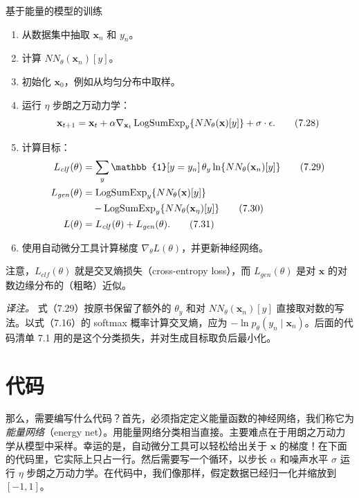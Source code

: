 \begin{booknote}[colframe=blue!65!black,colback=blue!4]{基于能量的模型的训练}
\begin{enumerate}
\item 从数据集中抽取 $\mathbf{x}_n$ 和 $y_n$。
\item 计算 $NN_\theta(\mathbf{x}_n)[y]$。
\item 初始化 $\mathbf{x}_0$，例如从均匀分布中取样。
\item 运行 $\eta$ 步朗之万动力学：
\begin{equation}
\mathbf{x}_{t+1}=\mathbf{x}_t+\alpha\nabla_{\mathbf{x}_t}
   \operatorname{LogSumExp}_y\{NN_\theta(\mathbf{x})[y]\}+\sigma\cdot\epsilon.
\tag{7.28}\label{eq:07-28}
\end{equation}
\item 计算目标：
\begin{align}
L_{\mathit{clf}}(\theta)
 &=\sum_y\mathbb{1}[y=y_n]\,\theta_y\ln\{NN_\theta(\mathbf{x}_n)[y]\}
        \tag{7.29}\label{eq:07-29}\\
L_{\mathit{gen}}(\theta)
 &=\LogSumExp_y\{NN_\theta(\mathbf{x})[y]\}\notag\\
 &\quad-\LogSumExp_y\{NN_\theta(\mathbf{x}_\eta)[y]\}
        \tag{7.30}\label{eq:07-30}\\
L(\theta)&=L_{\mathit{clf}}(\theta)+L_{\mathit{gen}}(\theta).
        \tag{7.31}\label{eq:07-31}
\end{align}
\item 使用自动微分工具计算梯度 $\nabla_\theta L(\theta)$，并更新神经网络。
\end{enumerate}
\end{booknote}
注意，$L_{\mathit{clf}}(\theta)$ 就是交叉熵损失（cross-entropy loss），而 $L_{\mathit{gen}}(\theta)$ 是对 $\mathbf{x}$ 的对数边缘分布的（粗略）近似。

\emph{译注。} 式（7.29）按原书保留了额外的 $\theta_y$ 和对 $NN_\theta(\mathbf{x}_n)[y]$ 直接取对数的写法。以式（7.16）的 softmax 概率计算交叉熵，应为 $-\ln p_\theta(y_n\mid\mathbf{x}_n)$。后面的代码清单 7.1 用的是这个分类损失，并对生成目标取负后最小化。

\section{代码}
那么，需要编写什么代码？首先，必须指定定义能量函数的神经网络，我们称它为\emph{能量网络}（energy net）。用能量网络分类相当直接。主要难点在于用朗之万动力学从模型中采样。幸运的是，自动微分工具可以轻松给出关于 $\mathbf{x}$ 的梯度！在下面的代码里，它实际上只占一行。然后需要写一个循环，以步长 $\alpha$ 和噪声水平 $\sigma$ 运行 $\eta$ 步朗之万动力学。在代码中，我们像那样，假定数据已经归一化并缩放到 $[-1,1]$。

